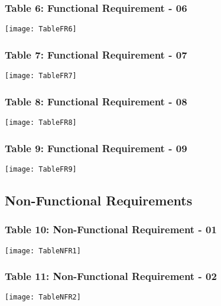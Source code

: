 \begin{figure}[ht]
\subsubsection{Table 6: Functional Requirement - 06}
\centering
\texttt{[image: TableFR6]}
\end{figure}

\begin{figure}[ht]
\subsubsection{Table 7: Functional Requirement - 07}
\centering
\texttt{[image: TableFR7]}
\end{figure}

\begin{figure}[ht]
\subsubsection{Table 8: Functional Requirement - 08}
\centering
\texttt{[image: TableFR8]}
\end{figure}

\begin{figure}[ht]
\subsubsection{Table 9: Functional Requirement - 09}
\centering
\texttt{[image: TableFR9]}
\end{figure}

\begin{figure}[ht]
\subsection{Non-Functional Requirements} 

\subsubsection{Table 10: Non-Functional Requirement - 01}
\centering
\texttt{[image: TableNFR1]}
\end{figure}

\begin{figure}[ht]
\subsubsection{Table 11: Non-Functional Requirement - 02}
\centering
\texttt{[image: TableNFR2]}
\end{figure}

